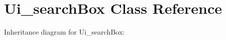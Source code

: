 \hypertarget{classUi__searchBox}{}\section{Ui\+\_\+search\+Box Class Reference}
\label{classUi__searchBox}


Inheritance diagram for Ui\+\_\+search\+Box\+:
